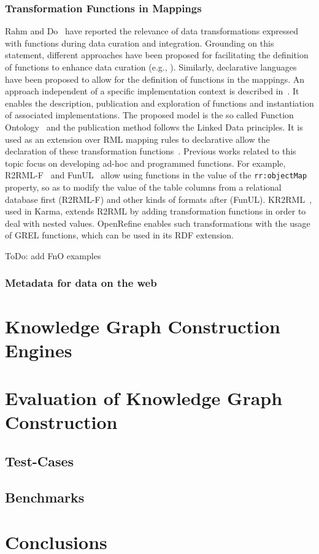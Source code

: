 \subsubsection{Transformation Functions in Mappings}
Rahm and Do~\citep{rahm2000data} have reported the relevance of data transformations expressed with functions during data curation and integration. Grounding on this statement, different approaches have been proposed for facilitating the definition of functions to enhance data curation (e.g., \citep{galhardas2001declarative,GuptaSKGTM12,raman2001potter}). Similarly, declarative languages have been proposed to allow for the definition of functions in the mappings. An approach independent of a specific implementation context is described in~\citep{demeester2019implementation}. It enables the description, publication and exploration of functions and instantiation of associated implementations. The proposed model is the so called Function Ontology~\citep{de2016ontology} and the publication method follows the Linked Data principles. It is used as an extension over RML mapping rules to declarative allow the declaration of these transformation functions~\citep{de2017declarative}. Previous works related to this topic focus on developing ad-hoc and programmed functions. For example, R2RML-F~\citep{debruyne2016r2rml} and FunUL~\cite{junior2016funul,junior2016incorporating} allow using functions in the value of the \texttt{rr:objectMap} property, so as to modify the value of the table columns from a relational database first (R2RML-F) and other kinds of formats after (FunUL). KR2RML~\citep{slepicka2015kr2rml}, used in Karma, extends R2RML by adding transformation functions in order to deal with nested values. OpenRefine enables such transformations with the usage of GREL functions, which can be used in its RDF extension. 

ToDo: add FnO examples

\subsubsection{Metadata for data on the web}


\section{Knowledge Graph Construction Engines}

\section{Evaluation of Knowledge Graph Construction}

\subsection{Test-Cases}
\subsection{Benchmarks}



\section{Conclusions}
